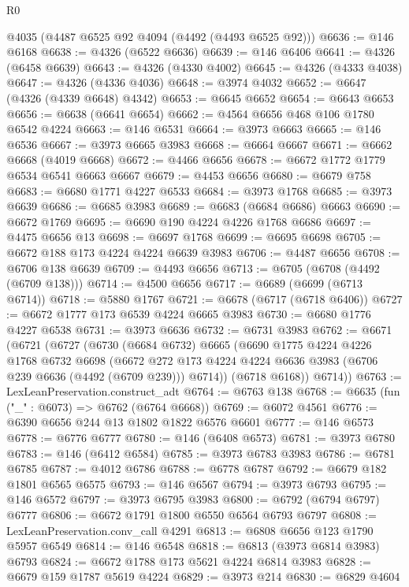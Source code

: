 \begin{lexlean}{R0}
\begin{coremodule}
    @4035
    (@4487 @6525 @92 @4094 (@4492 (@4493 @6525 @92)))
@6636 := @146 @6168
@6638 := @4326 (@6522 @6636)
@6639 := @146 @6406
@6641 := @4326 (@6458 @6639)
@6643 := @4326 (@4330 @4002)
@6645 := @4326 (@4333 @4038)
@6647 := @4326 (@4336 @4036)
@6648 := @3974 @4032
@6652 := @6647 (@4326 (@4339 @6648) @4342)
@6653 := @6645 @6652
@6654 := @6643 @6653
@6656 := @6638 (@6641 @6654)
@6662 := @4564 @6656 @468 @106 @1780 @6542 @4224
@6663 := @146 @6531
@6664 := @3973 @6663
@6665 := @146 @6536
@6667 := @3973 @6665 @3983
@6668 := @6664 @6667
@6671 := @6662 @6668 (@4019 @6668)
@6672 := @4466 @6656
@6678 := @6672 @1772 @1779 @6534 @6541 @6663 @6667
@6679 := @4453 @6656
@6680 := @6679 @758
@6683 := @6680 @1771 @4227 @6533
@6684 := @3973 @1768
@6685 := @3973 @6639
@6686 := @6685 @3983
@6689 := @6683 (@6684 @6686) @6663
@6690 := @6672 @1769
@6695 := @6690 @190 @4224 @4226 @1768 @6686
@6697 := @4475 @6656 @13
@6698 := @6697 @1768
@6699 := @6695 @6698
@6705 := @6672 @188 @173 @4224 @4224 @6639 @3983
@6706 := @4487 @6656
@6708 := @6706 @138 @6639
@6709 := @4493 @6656
@6713 := @6705 (@6708 (@4492 (@6709 @138)))
@6714 := @4500 @6656
@6717 := @6689 (@6699 (@6713 @6714))
@6718 := @5880 @1767
@6721 := @6678 (@6717 (@6718 @6406))
@6727 := @6672 @1777 @173 @6539 @4224 @6665 @3983
@6730 := @6680 @1776 @4227 @6538
@6731 := @3973 @6636
@6732 := @6731 @3983
@6762 := @6671
    (@6721
      (@6727
        (@6730
          (@6684 @6732)
          @6665
          (@6690
            @1775
            @4224
            @4226
            @1768
            @6732
            @6698
            (@6672 @272 @173 @4224 @4224 @6636 @3983 (@6706 @239 @6636 (@4492 (@6709 @239))) @6714))
          (@6718 @6168))
        @6714))
@6763 := LexLeanPreservation.construct_adt
@6764 := @6763 @138
@6768 := @6635 (fun ("_" : @6073) => @6762 (@6764 @6668))
@6769 := @6072 @4561
@6776 := @6390 @6656 @244 @13 @1802 @1822 @6576 @6601
@6777 := @146 @6573
@6778 := @6776 @6777
@6780 := @146 (@6408 @6573)
@6781 := @3973 @6780
@6783 := @146 (@6412 @6584)
@6785 := @3973 @6783 @3983
@6786 := @6781 @6785
@6787 := @4012 @6786
@6788 := @6778 @6787
@6792 := @6679 @182 @1801 @6565 @6575
@6793 := @146 @6567
@6794 := @3973 @6793
@6795 := @146 @6572
@6797 := @3973 @6795 @3983
@6800 := @6792 (@6794 @6797) @6777
@6806 := @6672 @1791 @1800 @6550 @6564 @6793 @6797
@6808 := LexLeanPreservation.conv_call @4291
@6813 := @6808 @6656 @123 @1790 @5957 @6549
@6814 := @146 @6548
@6818 := @6813 (@3973 @6814 @3983) @6793
@6824 := @6672 @1788 @173 @5621 @4224 @6814 @3983
@6828 := @6679 @159 @1787 @5619 @4224
@6829 := @3973 @214
@6830 := @6829 @4604

\end{coremodule}
\end{lexlean}

